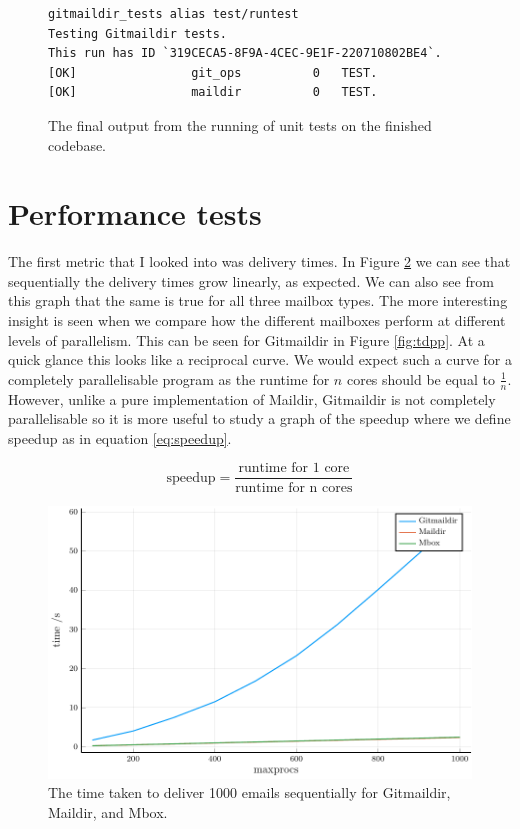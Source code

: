 \begin{figure}[h]
\centering
\begin{Verbatim}
gitmaildir_tests alias test/runtest
Testing Gitmaildir tests.
This run has ID `319CECA5-8F9A-4CEC-9E1F-220710802BE4`.
[OK]                git_ops          0   TEST.
[OK]                maildir          0   TEST.
\end{Verbatim}
\caption{The final output from the running of unit tests on the finished codebase.}
\label{fig:unittests}
\end{figure}

\section{Performance tests}

The first metric that I looked into was delivery times. In Figure \ref{fig:tds_combined} we can see that sequentially the delivery times grow linearly, as expected. We can also see from this graph that the same is true for all three mailbox types. The more interesting insight is seen when we compare how the different mailboxes perform at different levels of parallelism. This can be seen for Gitmaildir in Figure \ref{fig:tdpp}. At a quick glance this looks like a reciprocal curve. We would expect such a curve for a completely parallelisable program as the runtime for $n$ cores should be equal to $\frac{1}{n}$. However, unlike a pure implementation of Maildir, Gitmaildir is not completely parallelisable so it is more useful to study a graph of the speedup where we define speedup as in equation \ref{eq:speedup}.

\begin{equation} \label{eq:speedup}
\textrm{speedup} = \frac{\textrm{runtime for 1 core}}{\textrm{runtime for n cores}}
\end{equation}

\begin{figure}[h]
    \centering
    \includegraphics{figs/tds_combined}
    \caption{The time taken to deliver 1000 emails sequentially for Gitmaildir, Maildir, and Mbox.}
    \label{fig:tds_combined}
\end{figure}


